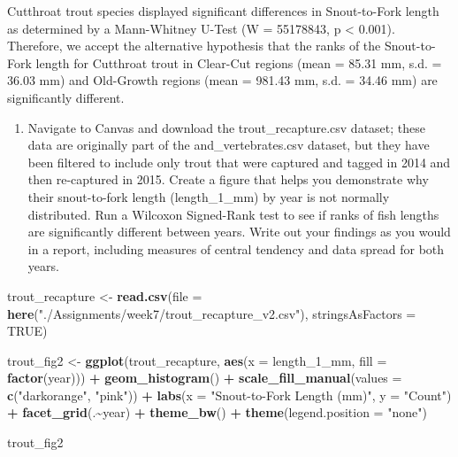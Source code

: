 \documentclass[
]{article}
\newenvironment{Shaded}{\begin{snugshade}}{\end{snugshade}}
\newcommand{\AttributeTok}[1]{\textcolor[rgb]{0.13,0.29,0.53}{#1}}
\newcommand{\ConstantTok}[1]{\textcolor[rgb]{0.56,0.35,0.01}{#1}}
\newcommand{\FunctionTok}[1]{\textcolor[rgb]{0.13,0.29,0.53}{\textbf{#1}}}
\newcommand{\NormalTok}[1]{#1}
\newcommand{\OtherTok}[1]{\textcolor[rgb]{0.56,0.35,0.01}{#1}}
\newcommand{\SpecialCharTok}[1]{\textcolor[rgb]{0.81,0.36,0.00}{\textbf{#1}}}
\newcommand{\StringTok}[1]{\textcolor[rgb]{0.31,0.60,0.02}{#1}}
\providecommand{\tightlist}{%
  \setlength{\itemsep}{0pt}\setlength{\parskip}{0pt}}
\begin{document}
Cutthroat trout species displayed significant diﬀerences in
Snout-to-Fork length as determined by a Mann-Whitney U-Test (W =
55178843, p \textless{} 0.001). Therefore, we accept the alternative
hypothesis that the ranks of the Snout-to-Fork length for Cutthroat
trout in Clear-Cut regions (mean = 85.31 mm, s.d. = 36.03 mm) and
Old-Growth regions (mean = 981.43 mm, s.d. = 34.46 mm) are significantly
different.

\begin{enumerate}
\def\labelenumi{\alph{enumi}.}
\setcounter{enumi}{1}
\tightlist
\item
  Navigate to Canvas and download the trout\_recapture.csv dataset;
  these data are originally part of the and\_vertebrates.csv dataset,
  but they have been filtered to include only trout that were captured
  and tagged in 2014 and then re-captured in 2015. Create a figure that
  helps you demonstrate why their snout-to-fork length (length\_1\_mm)
  by year is not normally distributed. Run a Wilcoxon Signed-Rank test
  to see if ranks of fish lengths are significantly diﬀerent between
  years. Write out your findings as you would in a report, including
  measures of central tendency and data spread for both years.
\end{enumerate}

\begin{Shaded}
\begin{Highlighting}[]
\NormalTok{trout\_recapture }\OtherTok{\textless{}{-}} \FunctionTok{read.csv}\NormalTok{(}\AttributeTok{file =} \FunctionTok{here}\NormalTok{(}\StringTok{"./Assignments/week7/trout\_recapture\_v2.csv"}\NormalTok{),}
                           \AttributeTok{stringsAsFactors =} \ConstantTok{TRUE}\NormalTok{)}

\NormalTok{trout\_fig2 }\OtherTok{\textless{}{-}} \FunctionTok{ggplot}\NormalTok{(trout\_recapture, }\FunctionTok{aes}\NormalTok{(}\AttributeTok{x =}\NormalTok{ length\_1\_mm, }\AttributeTok{fill =} \FunctionTok{factor}\NormalTok{(year))) }\SpecialCharTok{+}
  \FunctionTok{geom\_histogram}\NormalTok{() }\SpecialCharTok{+}
  \FunctionTok{scale\_fill\_manual}\NormalTok{(}\AttributeTok{values =} \FunctionTok{c}\NormalTok{(}\StringTok{"darkorange"}\NormalTok{, }\StringTok{"pink"}\NormalTok{)) }\SpecialCharTok{+}
  \FunctionTok{labs}\NormalTok{(}\AttributeTok{x =} \StringTok{"Snout{-}to{-}Fork Length (mm)"}\NormalTok{, }\AttributeTok{y =} \StringTok{"Count"}\NormalTok{) }\SpecialCharTok{+}
  \FunctionTok{facet\_grid}\NormalTok{(.}\SpecialCharTok{\textasciitilde{}}\NormalTok{year) }\SpecialCharTok{+}
  \FunctionTok{theme\_bw}\NormalTok{() }\SpecialCharTok{+}
  \FunctionTok{theme}\NormalTok{(}\AttributeTok{legend.position =} \StringTok{"none"}\NormalTok{)}

\NormalTok{trout\_fig2}
\end{Highlighting}
\end{Shaded}
\end{document}
